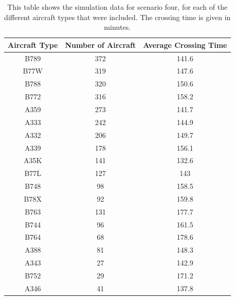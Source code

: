\documentclass[stu, a4paper, 12pt, floatsintext]{apa7}
\numberwithin{figure}{section}
\numberwithin{table}{section}
\numberwithin{equation}{section}
\begin{document}
\begin{table}[H]
    \centering
    \caption{This table shows the simulation data for scenario four, for each of the different aircraft types that were included. The crossing time is given in minutes.}
    \label{tab:3.5}
    \begin{tabular}{@{}ccc@{}}
    \toprule
    \textbf{Aircraft Type} & \textbf{Number of Aircraft} & \textbf{Average Crossing Time} \\ \midrule
    B789                   & 372                         & 141.6                          \\
    B77W                   & 319                         & 147.6                          \\
    B788                   & 320                         & 150.6                          \\
    B772                   & 316                         & 158.2                          \\
    A359                   & 273                         & 141.7                          \\
    A333                   & 242                         & 144.9                          \\
    A332                   & 206                         & 149.7                          \\
    A339                   & 178                         & 156.1                          \\
    A35K                   & 141                         & 132.6                          \\
    B77L                   & 127                         & 143                            \\
    B748                   & 98                          & 158.5                          \\
    B78X                   & 92                          & 159.8                          \\
    B763                   & 131                         & 177.7                          \\
    B744                   & 96                          & 161.5                          \\
    B764                   & 68                          & 178.6                          \\
    A388                   & 81                          & 148.3                          \\
    A343                   & 27                          & 142.9                          \\
    B752                   & 29                          & 171.2                          \\
    A346                   & 41                          & 137.8                          \\ \bottomrule
    \end{tabular}
\end{table}
\end{document}
